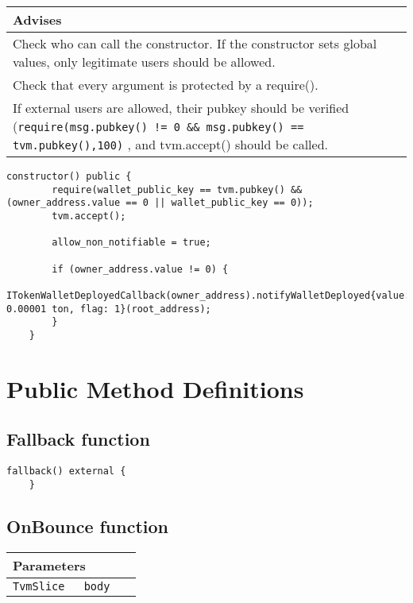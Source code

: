 \ifsoldraft
\noindent\begin{tabular}{|p{12cm}|}\hline
\rowcolor{green}Advises
\\\hline
Check who can call the constructor. If the constructor sets global values, only legitimate users should be allowed.
\\\hline
Check that every argument is protected by a require().
\\\hline
If external users are allowed, their pubkey should be verified (\verb+require(msg.pubkey() != 0 && msg.pubkey() == tvm.pubkey(),100)+ , and tvm.accept() should be called.
\\\hline\end{tabular}
\fi
\vspace{2cm}

\begin{lstlisting}[firstnumber=43]
    constructor() public {
        require(wallet_public_key == tvm.pubkey() && (owner_address.value == 0 || wallet_public_key == 0));
        tvm.accept();

        allow_non_notifiable = true;

        if (owner_address.value != 0) {
            ITokenWalletDeployedCallback(owner_address).notifyWalletDeployed{value: 0.00001 ton, flag: 1}(root_address);
        }
    }
\end{lstlisting}

\section{Public Method Definitions}


\subsection{Fallback function}

\vspace{2cm}

\begin{lstlisting}[firstnumber=683]
    fallback() external {
    }
\end{lstlisting}

\subsection{OnBounce function}


\ifsoltables
\noindent\begin{tabular}{|l|l|p{5cm}|}\hline
\multicolumn{3}{|l|}{\bf Parameters}\\\hline
\tt TvmSlice & \tt body &\\\hline
\end{tabular}
\fi

